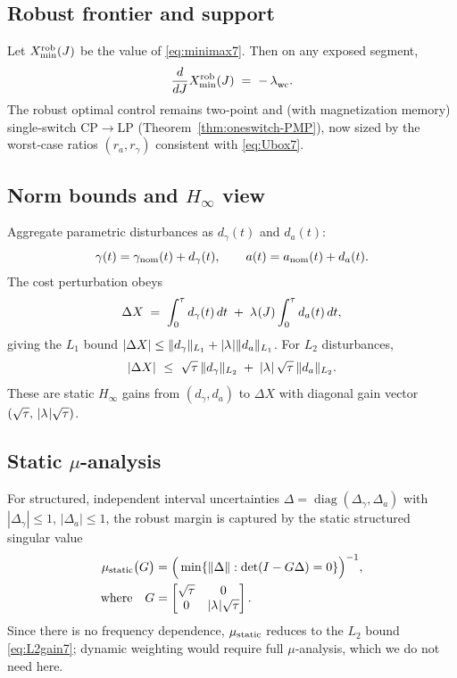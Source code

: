 \documentclass[aps,pre,twocolumn,showpacs,superscriptaddress]{revtex4-2}
\theoremstyle{definition}
\begin{document}
\subsection{Robust frontier and support}\label{subsec:robustFront7}

Let $X_{\min}^{\rm rob}(J)$ be the value of \eqref{eq:minimax7}. Then on any exposed segment,
\begin{equation}\label{eq:robFront7}
\frac{d}{dJ}X_{\min}^{\rm rob}(J) \;=\; -\,\lambda^{\*}_{\rm wc}.
\end{equation}
The robust optimal control remains two‑point and (with magnetization memory) single‑switch CP$\to$LP (Theorem~\ref{thm:oneswitch-PMP}), now sized by the worst‑case ratios $(r_a,r_\gamma)$ consistent with \eqref{eq:Ubox7}.

\subsection{Norm bounds and $H_\infty$ view}\label{subsec:Hinf7}

Aggregate parametric disturbances as $d_\gamma(t)$ and $d_a(t)$:
\[
\gamma(t)=\gamma_{\rm nom}(t)+d_\gamma(t),\qquad a(t)=a_{\rm nom}(t)+d_a(t).
\]
The cost perturbation obeys
\begin{equation}\label{eq:L1gain7}
\Delta X \;=\; \int_0^\tau d_\gamma(t)\,dt \;+\; \lambda^{\*}(J)\int_0^\tau d_a(t)\,dt,
\end{equation}
giving the $L_1$ bound $|\Delta X|\le \|d_\gamma\|_{L_1}+|\lambda^{\*}|\|d_a\|_{L_1}$. For $L_2$ disturbances,
\begin{equation}\label{eq:L2gain7}
|\Delta X|\ \le\ \sqrt{\tau}\,\|d_\gamma\|_{L_2}\;+\;|\lambda^{\*}|\,\sqrt{\tau}\,\|d_a\|_{L_2}.
\end{equation}
These are static $H_\infty$ gains from $(d_\gamma,d_a)$ to $\Delta X$ with diagonal gain vector $(\sqrt{\tau},\,|\lambda^{\*}|\sqrt{\tau})$.

\subsection{Static $\mu$-analysis}\label{subsec:mu7}

For structured, independent interval uncertainties $\Delta=\operatorname{diag}(\Delta_\gamma,\Delta_a)$ with $|\Delta_\gamma|\le 1$, $|\Delta_a|\le 1$, the robust margin is captured by the static structured singular value
\begin{align}
\mu_{\rm static}\big(G\big)&=\Big(\min\{\|\Delta\|: \det(I-G\Delta)=0\}\Big)^{-1},\\
\text{where}\quad G&=\begin{bmatrix}\sqrt{\tau}&0\\0&|\lambda^{\*}|\sqrt{\tau}\end{bmatrix}.\nonumber
\end{align}
Since there is no frequency dependence, $\mu_{\rm static}$ reduces to the $L_2$ bound \eqref{eq:L2gain7}; dynamic weighting would require full $\mu$‑analysis, which we do not need here.
\end{document}
